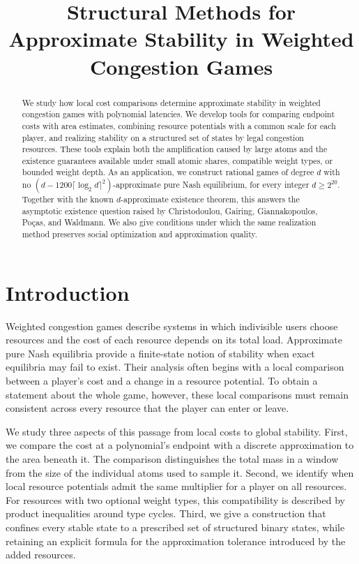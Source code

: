 \documentclass[manuscript,review,anonymous]{acmart}
\title{Structural Methods for Approximate Stability in Weighted Congestion Games}
\begin{document}
\begin{abstract}
We study how local cost comparisons determine approximate stability in weighted congestion games with polynomial latencies. We develop tools for comparing endpoint costs with area estimates, combining resource potentials with a common scale for each player, and realizing stability on a structured set of states by legal congestion resources. These tools explain both the amplification caused by large atoms and the existence guarantees available under small atomic shares, compatible weight types, or bounded weight depth. As an application, we construct rational games of degree $d$ with no $(d-1200\lceil\log_2d\rceil^2)$-approximate pure Nash equilibrium, for every integer $d\ge2^{20}$. Together with the known $d$-approximate existence theorem, this answers the asymptotic existence question raised by Christodoulou, Gairing, Giannakopoulos, Po\c{c}as, and Waldmann. We also give conditions under which the same realization method preserves social optimization and approximation quality.
\end{abstract}
\maketitle

\section{Introduction}
Weighted congestion games describe systems in which indivisible users choose resources and the cost of each resource depends on its total load. Approximate pure Nash equilibria provide a finite-state notion of stability when exact equilibria may fail to exist. Their analysis often begins with a local comparison between a player's cost and a change in a resource potential. To obtain a statement about the whole game, however, these local comparisons must remain consistent across every resource that the player can enter or leave.

We study three aspects of this passage from local costs to global stability. First, we compare the cost at a polynomial's endpoint with a discrete approximation to the area beneath it. The comparison distinguishes the total mass in a window from the size of the individual atoms used to sample it. Second, we identify when local resource potentials admit the same multiplier for a player on all resources. For resources with two optional weight types, this compatibility is described by product inequalities around type cycles. Third, we give a construction that confines every stable state to a prescribed set of structured binary states, while retaining an explicit formula for the approximation tolerance introduced by the added resources.
\end{document}

